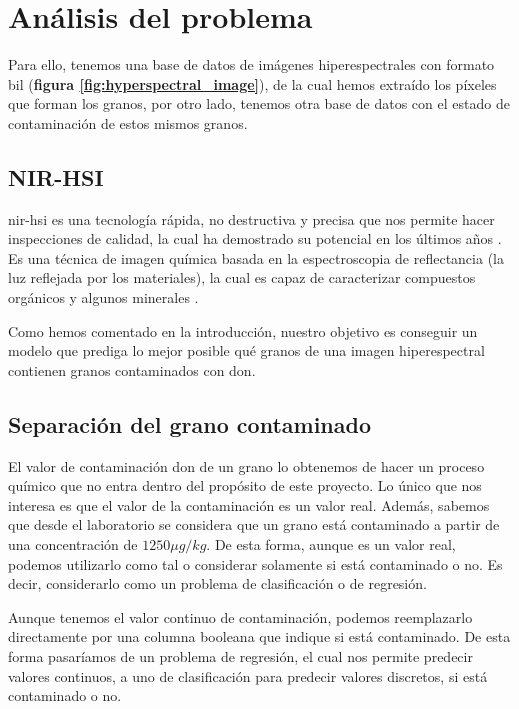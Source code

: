 \section{Análisis del problema}

 Para ello, tenemos una base de datos de imágenes hiperespectrales con formato \acrshort{bil} (\textbf{figura \ref{fig:hyperspectral_image}}), de la cual hemos extraído los píxeles que forman los granos, por otro lado, tenemos otra base de datos con el estado de contaminación de estos mismos granos. 


\subsection{NIR-HSI}

\gls{nir-hsi} es una tecnología rápida, no destructiva y precisa que nos permite hacer inspecciones de calidad, la cual ha demostrado su potencial en los últimos años \cite{Applicat5:online}. Es una técnica de imagen química basada en la espectroscopia de reflectancia (la luz reflejada por los materiales), la cual es capaz de caracterizar compuestos orgánicos y algunos minerales \cite{NIRHyper23:online}.

Como hemos comentado en la introducción, nuestro objetivo es conseguir un modelo que prediga lo mejor posible qué granos de una \gls{imagen hiperespectral} contienen granos contaminados con \acrshort{don}.


\subsection{Separación del grano contaminado}
\label{sec:separacion}

El valor de contaminación \gls{don} de un grano lo obtenemos de hacer un proceso químico que no entra dentro del propósito de este proyecto. Lo único que nos interesa es que el valor de la contaminación es un valor real. Además, sabemos que desde el laboratorio se considera que un grano está contaminado a partir de una concentración de $1250 \mu g/kg$. De esta forma, aunque es un valor real, podemos utilizarlo como tal o considerar solamente si está contaminado o no. Es decir, considerarlo como un problema de \gls{clasificación} o de \gls{regresión}.

Aunque tenemos el valor continuo de contaminación, podemos reemplazarlo directamente por una columna booleana que indique si está contaminado. De esta forma pasaríamos de un problema de regresión, el cual nos permite predecir valores continuos, a uno de clasificación para predecir valores discretos, si está contaminado o no.

